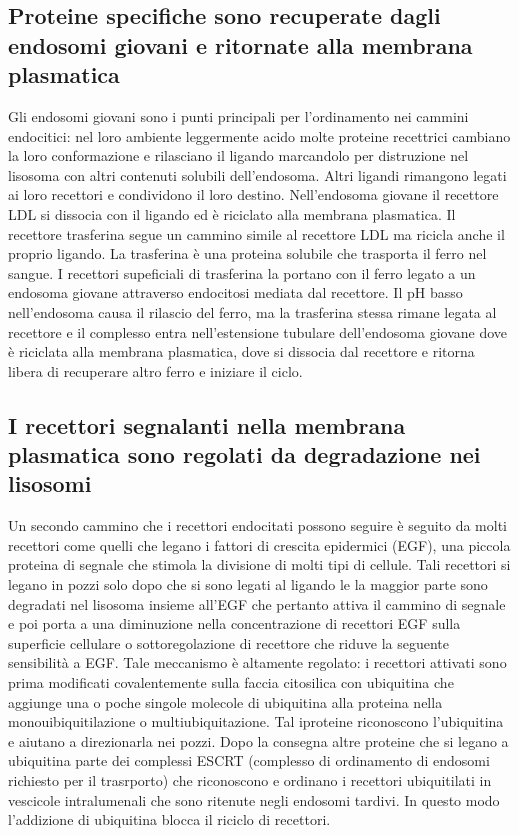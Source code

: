 \subsection{Proteine specifiche sono recuperate dagli endosomi giovani e ritornate alla membrana plasmatica}
Gli endosomi giovani sono i punti principali per l'ordinamento nei cammini endocitici: nel loro ambiente leggermente acido molte proteine recettrici cambiano la loro conformazione e 
rilasciano il ligando marcandolo per distruzione nel lisosoma con altri contenuti solubili dell'endosoma. Altri ligandi rimangono legati ai loro recettori e condividono il loro destino.
Nell'endosoma giovane il recettore LDL si dissocia con il ligando ed \`e riciclato alla membrana plasmatica. Il recettore trasferina segue un cammino simile al recettore LDL ma ricicla
anche il proprio ligando. La trasferina \`e una proteina solubile che trasporta il ferro nel sangue. I recettori supeficiali di trasferina la portano con il ferro legato a un endosoma 
giovane attraverso endocitosi mediata dal recettore. Il  pH basso nell'endosoma causa il rilascio del ferro, ma la trasferina stessa rimane legata al recettore e il complesso entra
nell'estensione tubulare dell'endosoma giovane dove \`e riciclata alla membrana plasmatica, dove si dissocia dal recettore e ritorna libera di recuperare altro ferro e iniziare il ciclo.
\subsection{I recettori segnalanti nella membrana plasmatica sono regolati da degradazione nei lisosomi}
Un secondo cammino che i recettori endocitati possono seguire \`e seguito da molti recettori come quelli che legano i fattori di crescita epidermici (EGF), una piccola proteina di 
segnale che stimola la divisione di molti tipi di cellule. Tali recettori si legano in pozzi solo dopo che si sono legati al ligando le la maggior parte sono degradati nel lisosoma 
insieme all'EGF che pertanto attiva il cammino di segnale e poi porta a una diminuzione nella concentrazione di recettori EGF sulla superficie cellulare o sottoregolazione di recettore 
che riduve la seguente sensibilit\`a a EGF. Tale meccanismo \`e altamente regolato: i recettori attivati sono prima modificati covalentemente sulla faccia citosilica con ubiquitina che
aggiunge una o poche singole molecole di ubiquitina alla proteina nella monouibiquitilazione o multiubiquitazione. Tal iproteine riconoscono l'ubiquitina e aiutano a direzionarla
nei pozzi. Dopo la consegna altre proteine che si legano a ubiquitina parte dei complessi ESCRT (complesso di ordinamento di endosomi richiesto per il trasrporto) che riconoscono e
ordinano i recettori ubiquitilati in vescicole intralumenali che sono ritenute negli endosomi tardivi. In questo modo l'addizione di ubiquitina blocca il riciclo di recettori.
